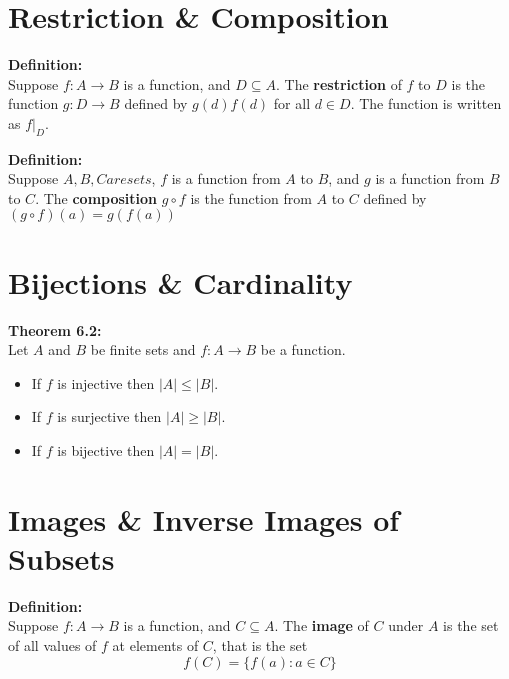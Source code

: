\documentclass{report}
\newenvironment{frameblue}[1][BlueViolet]
  {\begin{tcolorbox}[colframe=#1,colback=white]}
  {\end{tcolorbox}}
\newenvironment{framered}[1][Maroon]
  {\begin{tcolorbox}[colframe=#1,colback=white]}
  {\end{tcolorbox}}
\begin{document}
\section{Restriction \& Composition}

\begin{frameblue}
    \textbf{Definition:}\\
    Suppose $f : A \rightarrow B$ is a function, and $D \subseteq A$. The \textbf{restriction} of $f$ to $D$ is the function $g : D \rightarrow B$ defined by $g(d) f(d)$ for all $d \in D$. The function is written as $f|_D$.
\end{frameblue}

\begin{frameblue}
    \textbf{Definition:}\\
    Suppose $A, B, C are sets$, $f$ is a function from $A$ to $B$, and $g$ is a function from $B$ to $C$. The \textbf{composition} $g \circ f$ is the function from $A$ to $C$ defined by $(g \circ f)(a) = g(f(a))$
\end{frameblue}

\section{Bijections \& Cardinality}

\begin{framered}
    \textbf{Theorem 6.2:}\\
    Let $A$ and $B$ be finite sets and $f : A \rightarrow B$ be a function.
    \begin{itemize}
        \item If $f$ is injective then $|A| \leq |B|$.
        \item If $f$ is surjective then $|A| \geq |B|$.
        \item If $f$ is bijective then $|A| = |B|$.
    \end{itemize}
\end{framered}

\section{Images \& Inverse Images of Subsets}

\begin{frameblue}
    \textbf{Definition:}\\
    Suppose $f : A \rightarrow B$ is a function, and $C \subseteq A$. The \textbf{image} of $C$ under $A$ is the set of all values of $f$ at elements of $C$, that is the set
    \begin{equation*}
        f(C) = \{f(a) : a \in C\}
    \end{equation*}
\end{frameblue}
\end{document}
